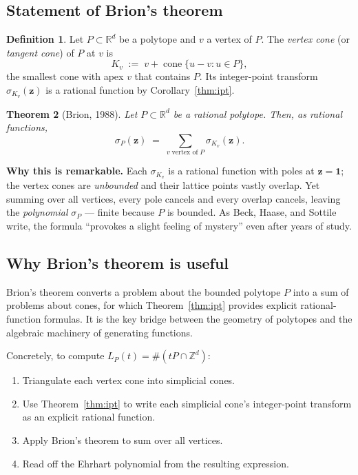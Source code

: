 \documentclass[11pt]{article}
\theoremstyle{plain}
\newtheorem{theorem}{Theorem}[section]
\theoremstyle{definition}
\newtheorem{definition}[theorem]{Definition}
\newcommand{\Z}{\mathbb{Z}}
\newcommand{\R}{\mathbb{R}}
\newcommand{\cone}{\operatorname{cone}}
\begin{document}
\subsection{Statement of Brion's theorem}
 
\begin{definition}
  Let $P \subset \R^d$ be a polytope and $v$ a vertex of $P$.  The
  \emph{vertex cone} (or \emph{tangent cone}) of $P$ at $v$ is
  \[
    K_v \;:=\; v + \cone\{u - v : u \in P\},
  \]
  the smallest cone with apex $v$ that contains $P$.  Its integer-point
  transform $\sigma_{K_v}(\mathbf{z})$ is a rational function by
  Corollary~\ref{thm:ipt}.
\end{definition}
 
\begin{theorem}[Brion, 1988]
  \label{thm:brion}
  Let $P \subset \R^d$ be a rational polytope.  Then, as rational functions,
  \[
    \boxed{\sigma_P(\mathbf{z})
    \;=\; \sum_{v \;\text{vertex of}\; P} \sigma_{K_v}(\mathbf{z}).}
  \]
\end{theorem}
 
\begin{keybox}
\textbf{Why this is remarkable.}  Each $\sigma_{K_v}$ is a rational function
with poles at $\mathbf{z} = \mathbf{1}$; the vertex cones are \emph{unbounded}
and their lattice points vastly overlap.  Yet summing over all vertices, every
pole cancels and every overlap cancels, leaving the \emph{polynomial}
$\sigma_P$ — finite because $P$ is bounded.  As Beck, Haase, and Sottile write,
the formula ``provokes a slight feeling of mystery'' even after years of study.
\end{keybox}
 
\subsection{Why Brion's theorem is useful}
 
Brion's theorem converts a problem about the bounded polytope $P$ into a sum
of problems about cones, for which Theorem~\ref{thm:ipt} provides explicit
rational-function formulas.  It is the key bridge between the geometry of
polytopes and the algebraic machinery of generating functions.
 
Concretely, to compute $L_P(t) = \#(tP \cap \Z^d)$:
\begin{enumerate}
  \item Triangulate each vertex cone into simplicial cones.
  \item Use Theorem~\ref{thm:ipt} to write each simplicial cone's
        integer-point transform as an explicit rational function.
  \item Apply Brion's theorem to sum over all vertices.
  \item Read off the Ehrhart polynomial from the resulting expression.
\end{enumerate}
\end{document}
